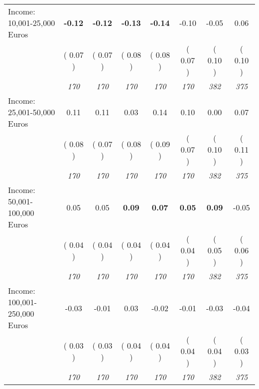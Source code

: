 \begin{tabular}{l c c c c c c c}
Income: 10,001-25,000 Euros & \textbf{     -0.12 } & \textbf{     -0.12 } & \textbf{     -0.13 } & \textbf{    -0.14} &     -0.10 &     -0.05 &      0.06 \\
& (     0.07 ) & (     0.07 ) & (     0.08 ) & (     0.08 ) & (     0.07 ) & (     0.10 ) & (     0.10 ) \\
& \textit{ 170 } & \textit{ 170 } & \textit{ 170 } & \textit{ 170 } & \textit{ 170 } & \textit{ 382 } & \textit{ 375 } \\
Income: 25,001-50,000 Euros &      0.11 &      0.11 &      0.03 &      0.14 &      0.10 &      0.00 &      0.07 \\
& (     0.08 ) & (     0.07 ) & (     0.08 ) & (     0.09 ) & (     0.07 ) & (     0.10 ) & (     0.11 ) \\
& \textit{ 170 } & \textit{ 170 } & \textit{ 170 } & \textit{ 170 } & \textit{ 170 } & \textit{ 382 } & \textit{ 375 } \\
Income: 50,001-100,000 Euros &      0.05 &      0.05 & \textbf{      0.09 } & \textbf{     0.07} & \textbf{     0.05} & \textbf{      0.09 } &     -0.05 \\
& (     0.04 ) & (     0.04 ) & (     0.04 ) & (     0.04 ) & (     0.04 ) & (     0.05 ) & (     0.06 ) \\
& \textit{ 170 } & \textit{ 170 } & \textit{ 170 } & \textit{ 170 } & \textit{ 170 } & \textit{ 382 } & \textit{ 375 } \\
Income: 100,001-250,000 Euros &     -0.03 &     -0.01 &      0.03 &     -0.02 &     -0.01 &     -0.03 &     -0.04 \\
& (     0.03 ) & (     0.03 ) & (     0.04 ) & (     0.04 ) & (     0.04 ) & (     0.04 ) & (     0.03 ) \\
& \textit{ 170 } & \textit{ 170 } & \textit{ 170 } & \textit{ 170 } & \textit{ 170 } & \textit{ 382 } & \textit{ 375 } \\
\bottomrule
\end{tabular}
